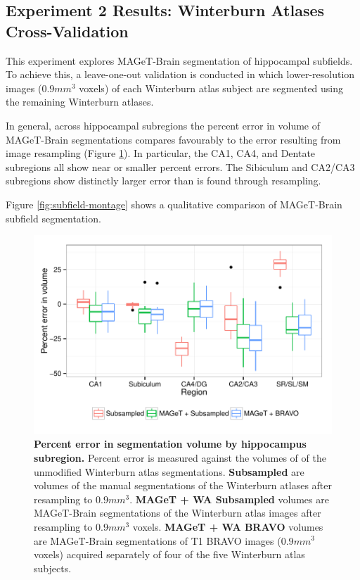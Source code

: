 \documentclass{article}\usepackage{graphicx, color}
\makeatletter
\def\maxwidth{ %
  \ifdim\Gin@nat@width>\linewidth
    \linewidth
  \else
    \Gin@nat@width
  \fi
}
\newenvironment{knitrout}{}{} %
\newcommand{\mb}{MAGeT-Brain }
\makeatother
\begin{document}
\subsection{Experiment 2 Results: Winterburn Atlases Cross-Validation}
This experiment explores \mb segmentation of hippocampal subfields. To
achieve this, a leave-one-out validation is conducted in which lower-resolution
images ($0.9mm^3$ voxels) of each Winterburn atlas subject are segmented using 
the remaining Winterburn atlases. 

In general, across hippocampal subregions the percent error in volume of
\mb segmentations compares
favourably to the error resulting from image resampling (Figure
\ref{fig:WAval-vol-boxplot}). In particular, the CA1, CA4, and Dentate
subregions all show near or smaller percent errors. The Sibiculum and CA2/CA3
subregions show distinctly larger error than is found through resampling.  

Figure \ref{fig:subfield-montage} shows a qualitative comparison of \mb subfield
segmentation.  


\begin{figure}[h!]
\begin{knitrout}
\color{fgcolor}

{\centering \includegraphics[width=\maxwidth]{figure/WAval-vol-boxplot} 

}



\end{knitrout}

  \caption{{\bf Percent error in segmentation volume by hippocampus subregion.} 
  Percent error is measured against the volumes of of the unmodified Winterburn
  atlas segmentations.
  {\bf Subsampled} are volumes of the manual segmentations of the Winterburn
  atlases after resampling to $0.9mm^3$.  
  {\bf MAGeT + WA Subsampled} volumes are \mb segmentations of the Winterburn atlas
  images after resampling to $0.9mm^3$ voxels.
  {\bf MAGeT + WA BRAVO} volumes are \mb segmentations of T1 BRAVO images
  ($0.9mm^3$ voxels) acquired separately of four of the five Winterburn atlas
  subjects.} 
  \label{fig:WAval-vol-boxplot}
\end{figure}
\end{document}
